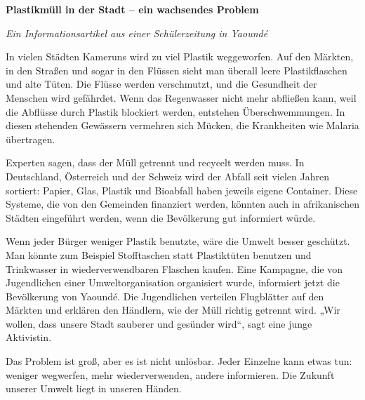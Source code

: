 \documentclass[11pt]{article}
\begin{document}
\begin{textebox}
\textbf{Plastikmüll in der Stadt – ein wachsendes Problem}

\emph{Ein Informationsartikel aus einer Schülerzeitung in Yaoundé}

In vielen Städten Kameruns wird zu viel Plastik weggeworfen. Auf den Märkten, in den Straßen und sogar in den Flüssen sieht man überall leere Plastikflaschen und alte Tüten. Die Flüsse werden verschmutzt, und die Gesundheit der Menschen wird gefährdet. Wenn das Regenwasser nicht mehr abfließen kann, weil die Abflüsse durch Plastik blockiert werden, entstehen Überschwemmungen. In diesen stehenden Gewässern vermehren sich Mücken, die Krankheiten wie Malaria übertragen.

Experten sagen, dass der Müll getrennt und recycelt werden muss. In Deutschland, Österreich und der Schweiz wird der Abfall seit vielen Jahren sortiert: Papier, Glas, Plastik und Bioabfall haben jeweils eigene Container. Diese Systeme, die von den Gemeinden finanziert werden, könnten auch in afrikanischen Städten eingeführt werden, wenn die Bevölkerung gut informiert würde.

Wenn jeder Bürger weniger Plastik benutzte, wäre die Umwelt besser geschützt. Man könnte zum Beispiel Stofftaschen statt Plastiktüten benutzen und Trinkwasser in wiederverwendbaren Flaschen kaufen. Eine Kampagne, die von Jugendlichen einer Umweltorganisation organisiert wurde, informiert jetzt die Bevölkerung von Yaoundé. Die Jugendlichen verteilen Flugblätter auf den Märkten und erklären den Händlern, wie der Müll richtig getrennt wird. „Wir wollen, dass unsere Stadt sauberer und gesünder wird“, sagt eine junge Aktivistin.

Das Problem ist groß, aber es ist nicht unlösbar. Jeder Einzelne kann etwas tun: weniger wegwerfen, mehr wiederverwenden, andere informieren. Die Zukunft unserer Umwelt liegt in unseren Händen.
\end{textebox}
\end{document}
